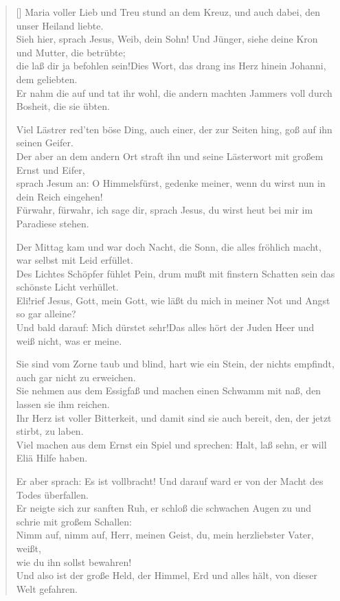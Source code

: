 \begin{center}
\begin{verse}[\versewidth]
 Maria voller Lieb und Treu stund an dem Kreuz, und auch dabei, den unser Heiland liebte.\\
\flqq Sieh hier\frqq, sprach Jesus, \flqq Weib, dein Sohn! Und Jünger, siehe deine Kron und Mutter, die betrübte;\\
die laß dir ja befohlen sein!\frqq Dies Wort, das drang ins Herz hinein Johanni, dem geliebten.\\
Er nahm die auf und tat ihr wohl, die andern machten Jammers voll durch Bosheit, die sie übten.

 Viel Lästrer red'ten böse Ding, auch einer, der zur Seiten hing, goß auf ihn seinen Geifer.\\
Der aber an dem andern Ort straft ihn und seine Lästerwort mit großem Ernst und Eifer,\\
sprach Jesum an: \flqq O Himmelsfürst, gedenke meiner, wenn du wirst nun in dein Reich eingehen!\frqq \\
\flqq Fürwahr, fürwahr, ich sage dir\frqq, sprach Jesus, \flqq du wirst heut bei mir im Paradiese stehen.\frqq

 Der Mittag kam und war doch Nacht, die Sonn, die alles fröhlich macht, war selbst mit Leid erfüllet.\\
Des Lichtes Schöpfer fühlet Pein, drum mußt mit finstern Schatten sein das schönste Licht verhüllet.\\
\flqq Eli!\frqq rief Jesus, \flqq Gott, mein Gott, wie läßt du mich in meiner Not und Angst so gar alleine?\frqq \\
Und bald darauf: \flqq Mich dürstet sehr!\frqq Das alles hört der Juden Heer und weiß nicht, was er meine.

 Sie sind vom Zorne taub und blind, hart wie ein Stein, der nichts empfindt, auch gar nicht zu erweichen.\\
Sie nehmen aus dem Essigfaß und machen einen Schwamm mit naß, den lassen sie ihm reichen.\\
Ihr Herz ist voller Bitterkeit, und damit sind sie auch bereit, den, der jetzt stirbt, zu laben.\\
Viel machen aus dem Ernst ein Spiel und sprechen: \flqq  Halt, laß sehn, er will Eliä Hilfe haben.\frqq

 Er aber sprach: Es ist vollbracht! Und darauf ward er von der Macht des Todes überfallen.\\
Er neigte sich zur sanften Ruh, er schloß die schwachen Augen zu und schrie mit großem Schallen:\\
\flqq Nimm auf, nimm auf, Herr, meinen Geist, du, mein herzliebster Vater, weißt,\\
wie du ihn sollst bewahren!\frqq \\
Und also ist der große Held, der Himmel, Erd und alles hält, von dieser Welt gefahren.


\end{verse}
\end{center}
